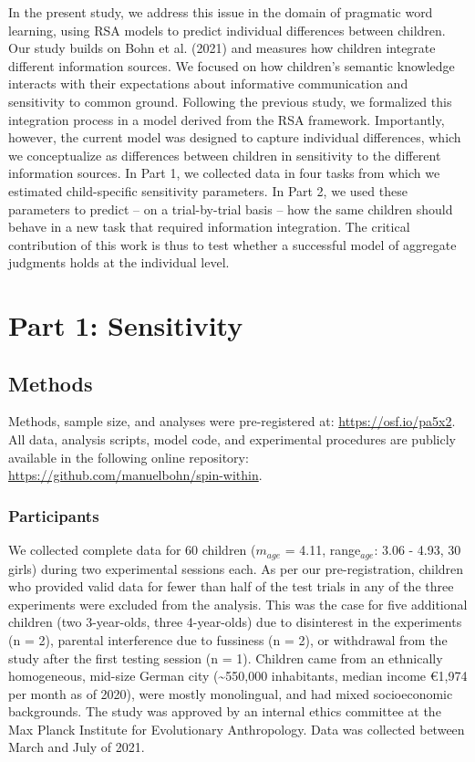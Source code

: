 \documentclass[
  man,floatsintext]{apa6}
\begin{document}
In the present study, we address this issue in the domain of pragmatic word learning, using RSA models to predict individual differences between children. Our study builds on Bohn et al. (2021) and measures how children integrate different information sources. We focused on how children's semantic knowledge interacts with their expectations about informative communication and sensitivity to common ground. Following the previous study, we formalized this integration process in a model derived from the RSA framework. Importantly, however, the current model was designed to capture individual differences, which we conceptualize as differences between children in sensitivity to the different information sources. In Part 1, we collected data in four tasks from which we estimated child-specific sensitivity parameters. In Part 2, we used these parameters to predict -- on a trial-by-trial basis -- how the same children should behave in a new task that required information integration. The critical contribution of this work is thus to test whether a successful model of aggregate judgments holds at the individual level.

\hypertarget{part-1-sensitivity}{%
\section{Part 1: Sensitivity}\label{part-1-sensitivity}}

\hypertarget{methods}{%
\subsection{Methods}\label{methods}}

Methods, sample size, and analyses were pre-registered at: \url{https://osf.io/pa5x2}. All data, analysis scripts, model code, and experimental procedures are publicly available in the following online repository: \url{https://github.com/manuelbohn/spin-within}.

\hypertarget{participants}{%
\subsubsection{Participants}\label{participants}}

We collected complete data for 60 children (\(m_{age}\) = 4.11, range\(_{age}\): 3.06 - 4.93, 30 girls) during two experimental sessions each. As per our pre-registration, children who provided valid data for fewer than half of the test trials in any of the three experiments were excluded from the analysis. This was the case for five additional children (two 3-year-olds, three 4-year-olds) due to disinterest in the experiments (n = 2), parental interference due to fussiness (n = 2), or withdrawal from the study after the first testing session (n = 1). Children came from an ethnically homogeneous, mid-size German city (\textasciitilde550,000 inhabitants, median income €1,974 per month as of 2020), were mostly monolingual, and had mixed socioeconomic backgrounds. The study was approved by an internal ethics committee at the Max Planck Institute for Evolutionary Anthropology. Data was collected between March and July of 2021.
\end{document}
